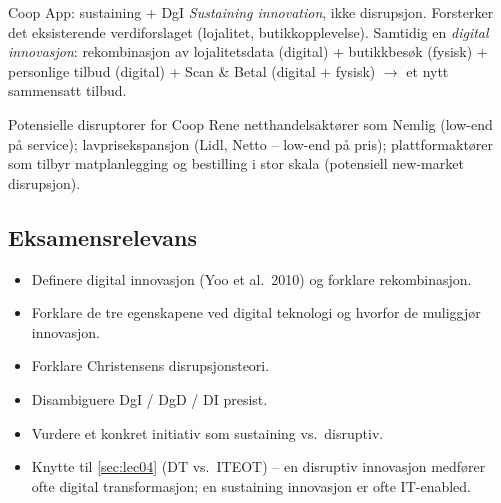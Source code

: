 \begin{eksempelboks}{Coop App: sustaining + DgI}
\emph{Sustaining innovation}, ikke disrupsjon. Forsterker det eksisterende
verdiforslaget (lojalitet, butikkopplevelse). Samtidig en \emph{digital
innovasjon}: rekombinasjon av lojalitetsdata (digital) + butikkbesøk (fysisk)
+ personlige tilbud (digital) + Scan \& Betal (digital + fysisk) $\rightarrow$
et nytt sammensatt tilbud.
\end{eksempelboks}

\begin{eksempelboks}{Potensielle disruptorer for Coop}
Rene netthandelsaktører som Nemlig (low-end på service); lavprisekspansjon
(Lidl, Netto -- low-end på pris); plattformaktører som tilbyr matplanlegging
og bestilling i stor skala (potensiell new-market disrupsjon).
\end{eksempelboks}

\subsection{Eksamensrelevans}
\begin{itemize}
  \item Definere digital innovasjon (Yoo et al.\ 2010) og forklare
    rekombinasjon.
  \item Forklare de tre egenskapene ved digital teknologi og hvorfor de
    muliggjør innovasjon.
  \item Forklare Christensens disrupsjonsteori.
  \item Disambiguere DgI / DgD / DI presist.
  \item Vurdere et konkret initiativ som sustaining vs.\ disruptiv.
  \item Knytte til \autoref{sec:lec04} (DT vs.\ ITEOT) -- en disruptiv
    innovasjon medfører ofte digital transformasjon; en sustaining
    innovasjon er ofte IT-enabled.
\end{itemize}
